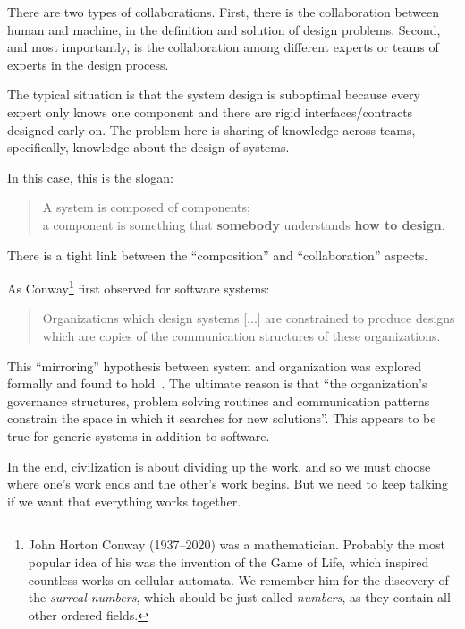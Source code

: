 There are two types of collaborations. First, there is the collaboration  between human and machine, in the definition and solution of design problems. Second, and most importantly, is the collaboration among different experts or teams of experts in the design process.

The typical situation is that the system design is suboptimal because every expert only knows one component and there are rigid interfaces/contracts designed early on. The problem here is sharing of knowledge across teams, specifically, knowledge about the design of systems.

In this case, this is the slogan:
 

\begin{quote}
    A system is composed of components;\\
      a component is something that \textbf{somebody} understands
      \textbf{how to design}.
\end{quote}


There is a tight link between the ``composition'' and ``collaboration'' aspects.

As Conway\footnote{John Horton Conway (1937--2020) was a mathematician. Probably the most 
popular idea of his was the invention of the Game of Life, which inspired countless
works on cellular automata. We remember him for the discovery of the \emph{surreal numbers},
which should be just called \emph{numbers}, as they contain all other ordered fields.} first observed for software systems:

\begin{quote}
Organizations which design systems [...] are constrained to produce designs which are copies of the communication structures of these organizations.
\end{quote}
 

This ``mirroring'' hypothesis between system and organization was explored formally and found to hold~\cite{maccormack12exploring}. The ultimate reason is that ``the organization's governance structures, problem solving routines and communication patterns constrain the space in which it searches for new solutions''. This appears to be true for generic systems in addition to software.


In the end, civilization is about dividing up the work, and so we must choose where one's work ends and the other's work begins. But we need to keep talking if we want that everything works together.
 

